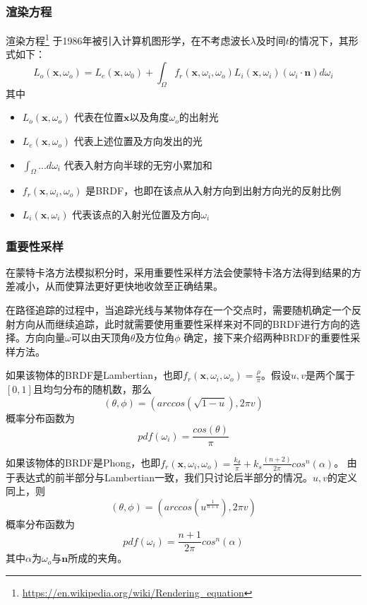 \subsubsection {渲染方程}
渲染方程\footnote{\url{https://en.wikipedia.org/wiki/Rendering_equation}} 于1986年被引入计算机图形学，在不考虑波长$\lambda$及时间$t$的情况下，其形式如下：
\[
    L_{o}(\bm{x}, \omega_{o})=L_{e}(\bm{x}, \omega_{0})+\int_{\Omega}f_{r}(\bm{x}, \omega_{i}, \omega_{o})L_{i}(\bm{x}, \omega_{i})(\omega_{i}\cdot\bm{n})d\omega_{i}
\]
其中\\
\begin{itemize}[noitemsep]
    \item $L_{o}(\bm{x}, \omega_{o})$ 代表在位置$\bm{x}$以及角度$\omega_{o}$的出射光
    \item $L_{e}(\bm{x}, \omega_{o})$ 代表上述位置及方向发出的光
    \item $\int_{\Omega} ...d\omega_{i}$ 代表入射方向半球的无穷小累加和
    \item $f_{r}(\bm{x}, \omega_{i}, \omega_{o})$ 是BRDF，也即在该点从入射方向到出射方向光的反射比例
    \item $L_{i}(\bm{x}, \omega_{i})$ 代表该点的入射光位置及方向$\omega_{i}$
\end{itemize}

\subsubsection {重要性采样}
在蒙特卡洛方法模拟积分时，采用重要性采样方法会使蒙特卡洛方法得到结果的方差减小，从而使算法更好更快地收敛至正确结果。

在路径追踪的过程中，当追踪光线与某物体存在一个交点时，需要随机确定一个反射方向从而继续追踪，此时就需要使用重要性采样来对不同的BRDF进行方向的选择。方向向量$\omega$可以由天顶角$\theta$及方位角$\phi$ 确定，接下来介绍两种BRDF的重要性采样方法。

如果该物体的BRDF是Lambertian，也即$f_{r}(\bm{x}, \omega_{i}, \omega_{o})=\frac{\rho}{\pi}$。假设$u,v$是两个属于$[0,1]$且均匀分布的随机数，那么
\[
    (\theta, \phi)=(arccos(\sqrt{1-u}), 2\pi v)
\]
概率分布函数为
\[
    pdf(\omega_{i})=\frac{cos(\theta)}{\pi}
\]

如果该物体的BRDF是Phong，也即$f_{r}(\bm{x}, \omega_{i}, \omega_{o})=\frac{k_{d}}{\pi}+k_{s}\frac{(n+2)}{2\pi}cos^{n}(\alpha)$。 由于表达式的前半部分与Lambertian一致，我们只讨论后半部分的情况。$u,v$的定义同上，则
\[
    (\theta, \phi)=(arccos(u^{\frac{1}{n+1}}), 2\pi v)
\]
概率分布函数为
\[
    pdf(\omega_{i})=\frac{n+1}{2\pi}cos^{n}(\alpha)
\]
其中$\alpha$为$\omega_{o}$与$\bm{n}$所成的夹角。

